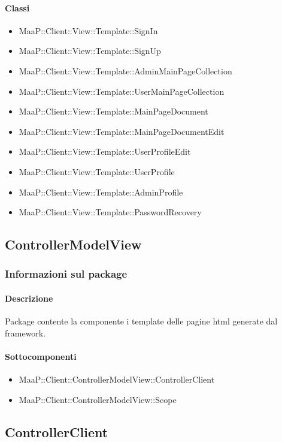 \paragraph{Classi}
\begin{itemize}
\item MaaP::Client::View::Template::SignIn
\item MaaP::Client::View::Template::SignUp
\item MaaP::Client::View::Template::AdminMainPageCollection
\item MaaP::Client::View::Template::UserMainPageCollection
\item MaaP::Client::View::Template::MainPageDocument
\item MaaP::Client::View::Template::MainPageDocumentEdit
\item MaaP::Client::View::Template::UserProfileEdit
\item MaaP::Client::View::Template::UserProfile
\item MaaP::Client::View::Template::AdminProfile
\item MaaP::Client::View::Template::PasswordRecovery
\end{itemize}


\subsection{ControllerModelView}
\subsubsection{Informazioni sul package}
\paragraph{Descrizione}
Package contente la componente i template delle pagine html generate dal framework.

\paragraph{Sottocomponenti}
\begin{itemize}
\item MaaP::Client::ControllerModelView::ControllerClient
\item MaaP::Client::ControllerModelView::Scope
\end{itemize}


\subsection{ControllerClient}
